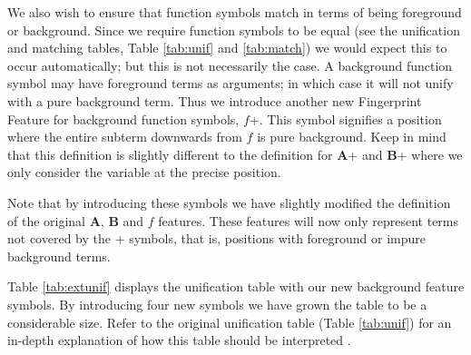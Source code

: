 We also wish to ensure that function symbols match in terms of being foreground or
background. Since we require function symbols to be equal (see the unification and
matching tables, Table \ref{tab:unif} and \ref{tab:match}) we would expect this
to occur automatically; but this is not necessarily the case. A background function symbol
may have foreground terms as arguments; in which case it will not unify with a
pure background term. Thus we introduce another new Fingerprint Feature for background function
symbols, $f$+. This symbol signifies a position where the entire subterm downwards from $f$
is pure background. Keep in mind that this definition is slightly different
to the definition for \textbf{A}+ and \textbf{B}+ where we only consider the variable
at the precise position.

Note that by introducing these symbols we have slightly modified the definition
of the original \textbf{A}, \textbf{B} and $f$ features. These features will now
only represent terms not covered by the + symbols, that is, positions with foreground or impure
background terms.

Table \ref{tab:extunif} displays the unification table with our new background
feature symbols. By introducing four new symbols we have grown the table to be a considerable size.
Refer to the original unification table (Table \ref{tab:unif}) for an in-depth
explanation of how this table should be interpreted \cite{shulz12}.


